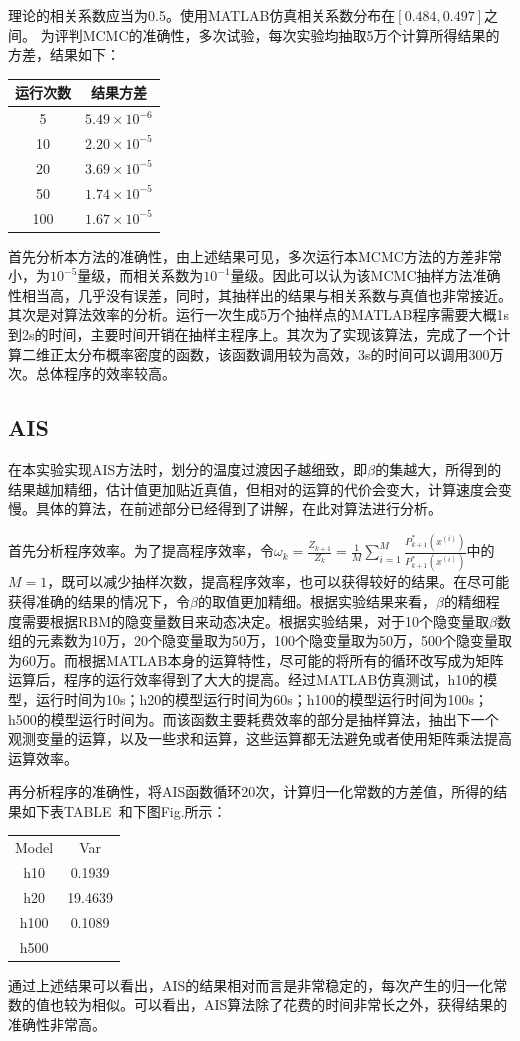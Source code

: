 \documentclass[journal,a4paper]{IEEEtran}
\begin{document}
		理论的相关系数应当为0.5。使用MATLAB仿真相关系数分布在$[0.484,0.497]$之间。
		为评判MCMC的准确性，多次试验，每次实验均抽取5万个计算所得结果的方差，结果如下：
		\begin{center}
		\begin{tabular}{c|c}
			\hline
			运行次数 & 结果方差\\
			\hline
			5 & $5.49\times10^{-6}$ \\
			10 & $2.20\times10^{-5}$ \\
			20 & $3.69\times10^{-5}$ \\
			50 & $1.74\times10^{-5}$ \\
			100 & $1.67\times10^{-5}$ \\
			\hline
		\end{tabular}
		\end{center}
		首先分析本方法的准确性，由上述结果可见，多次运行本MCMC方法的方差非常小，为$10^{-5}$量级，而相关系数为$10^{-1}$量级。因此可以认为该MCMC抽样方法准确性相当高，几乎没有误差，同时，其抽样出的结果与相关系数与真值也非常接近。
		其次是对算法效率的分析。运行一次生成5万个抽样点的MATLAB程序需要大概1s到2s的时间，主要时间开销在抽样主程序上。其次为了实现该算法，完成了一个计算二维正太分布概率密度的函数，该函数调用较为高效，3s的时间可以调用300万次。总体程序的效率较高。
	\subsection{AIS}
		在本实验实现AIS方法时，划分的温度过渡因子越细致，即$\beta$的集越大，所得到的结果越加精细，估计值更加贴近真值，但相对的运算的代价会变大，计算速度会变慢。具体的算法，在前述部分已经得到了讲解，在此对算法进行分析。
		
		首先分析程序效率。为了提高程序效率，令$ \omega_k = \frac{Z_{k+1}}{Z_k} =\frac{1}{M} \sum_{i = 1}^{M} \frac{P_{k+1}^*(x^{(i)})}{P_{k+1}^*(x^{(i)})}$中的$M=1$，既可以减少抽样次数，提高程序效率，也可以获得较好的结果。在尽可能获得准确的结果的情况下，令$\beta$的取值更加精细。根据实验结果来看，$\beta$的精细程度需要根据RBM的隐变量数目来动态决定。根据实验结果，对于10个隐变量取$\beta$数组的元素数为10万，20个隐变量取为50万，100个隐变量取为50万，500个隐变量取为60万。而根据MATLAB本身的运算特性，尽可能的将所有的循环改写成为矩阵运算后，程序的运行效率得到了大大的提高。经过MATLAB仿真测试，h10的模型，运行时间为10s；h20的模型运行时间为60s；h100的模型运行时间为100s；h500的模型运行时间为。而该函数主要耗费效率的部分是抽样算法，抽出下一个观测变量的运算，以及一些求和运算，这些运算都无法避免或者使用矩阵乘法提高运算效率。
		
		再分析程序的准确性，将AIS函数循环20次，计算归一化常数的方差值，所得的结果如下表TABLE~和下图Fig.所示：
		\begin{tabular}{cc}
			Model & Var \\
			h10 & 0.1939 \\
			h20 & 19.4639 \\
			h100 & 0.1089 \\
			h500 & \\
		\end{tabular}
		通过上述结果可以看出，AIS的结果相对而言是非常稳定的，每次产生的归一化常数的值也较为相似。可以看出，AIS算法除了花费的时间非常长之外，获得结果的准确性非常高。
\end{document}
